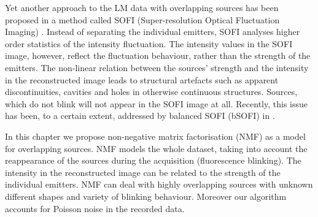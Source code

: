 Yet another approach to the LM data with overlapping sources has been proposed in a method called SOFI (Super-resolution Optical Fluctuation Imaging) \cite{Dertinger2010b}. Instead of separating the individual emitters, SOFI analyses higher order statistics of the intensity fluctuation. The intensity values in the SOFI image, however, reflect the fluctuation behaviour, rather than the strength of the emitters. The non-linear relation between the sources' strength and the intensity in the reconstructed image leads to structural artefacts such as apparent discontinuities, cavities and holes in otherwise continuous structures. Sources, which do not blink will not appear in the SOFI image at all. Recently, this issue has been, to a certain extent, addressed by balanced SOFI (bSOFI) in \cite{Geissbuehler2012}.

In this chapter we propose non-negative matrix factorisation (NMF) as a model for overlapping sources. NMF models the whole dataset, taking into account the reappearance of the sources during the acquisition (fluorescence blinking). The intensity in the reconstructed image can be related to the strength of the individual emitters. NMF can deal with highly  overlapping sources with unknown different shapes and variety of blinking behaviour. Moreover our algorithm accounts for Poisson noise in the recorded data. 
\afterpage{\clearpage}

